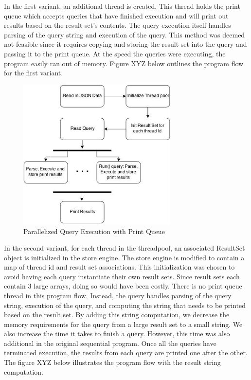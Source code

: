 \documentclass[11pt,journal,compsoc]{IEEEtran}
\begin{document}
In the first variant, an additional thread is created. This thread holds the print queue which accepts queries that have finished execution and will print out results based on the result set’s contents. The query execution itself handles parsing of the query string and execution of the query. This method was deemed not feasible since it requires copying and storing the result set into the query and passing it to the print queue. At the speed the queries were executing, the program easily ran out of memory. Figure XYZ below outlines the program flow for the first variant.

\begin{figure}
\includegraphics[height=3in]{images/query_parallel}
\caption{Parallelized Query Execution with Print Queue}
\label{fig_parallel_query}
\end{figure}

In the second variant, for each thread in the threadpool, an associated ResultSet object is initialized in the store engine. The store engine is modified to contain a map of thread id and result set associations. This initialization was chosen to avoid having each query instantiate their own result sets. Since result sets each contain 3 large arrays, doing so would have been costly. There is no print queue thread in this program flow. Instead, the query handles parsing of the query string, execution of the query, and computing the string that needs to be printed based on the result set. By adding this string computation, we decrease the memory requirements for the query from a large result set to a small string. We also increase the time it takes to finish a query. However, this time was also additional in the original sequential program. Once all the queries have terminated execution, the results from each query are printed one after the other. The figure XYZ below illustrates the program flow with the result string computation.
\end{document}

